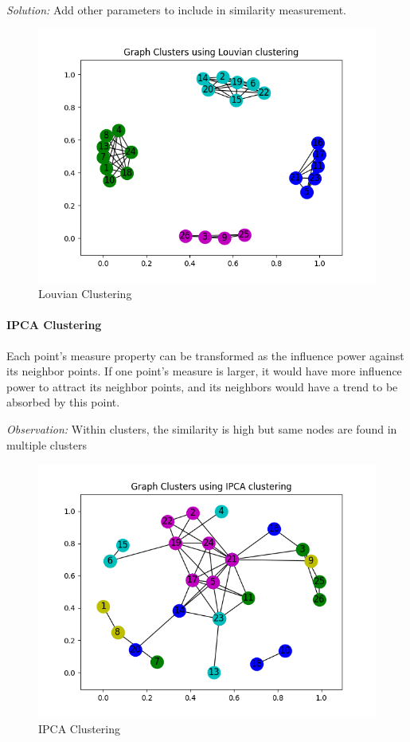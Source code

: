     \textit{Solution:} Add other parameters to include in similarity measurement. 
    
    
        \begin{figure}[H]
            \centering
                \centering
                \includegraphics[scale=0.5]{Images/cluster_louvian_1.png}
                \caption{Louvian Clustering}
        \end{figure}
    
\paragraph{IPCA Clustering}
    Each point’s measure property can be transformed as the influence power against its neighbor points.\cite{ipca} If one point’s measure is larger, it would have more
influence power to attract its neighbor points, and its neighbors would have a trend to be absorbed by this point.

    \textit{Observation:} Within clusters, the similarity is high but same nodes are found in multiple clusters

        \begin{figure}[H]
            \centering
                \centering
                \includegraphics[scale=0.5]{Images/cluster_IPCA_1.png}
                \caption{IPCA Clustering}
        \end{figure}



